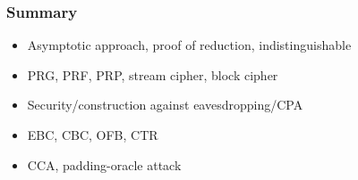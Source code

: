 \begin{frame}\frametitle{Summary}
\begin{itemize}
\item Asymptotic approach, proof of reduction, indistinguishable
\item PRG, PRF, PRP, stream cipher, block cipher
\item Security/construction against eavesdropping/CPA
\item EBC, CBC, OFB, CTR
\item CCA, padding-oracle attack
\end{itemize}
\end{frame}

